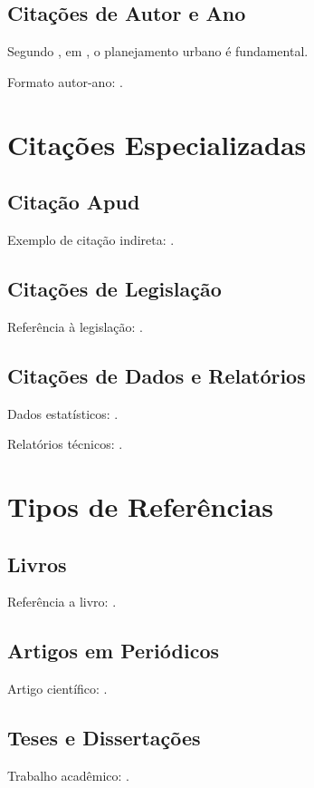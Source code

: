 \documentclass[mestrado]{UnB-PPGT}
\begin{document}
\subsection{Citações de Autor e Ano}
Segundo \citeauthor{costa2018}, em \citeyear{costa2018}, o planejamento urbano é fundamental.

Formato autor-ano: .

\section{Citações Especializadas}

\subsection{Citação Apud}
Exemplo de citação indireta: .

\subsection{Citações de Legislação}
Referência à legislação: .

\subsection{Citações de Dados e Relatórios}
Dados estatísticos: .

Relatórios técnicos: .

\section{Tipos de Referências}

\subsection{Livros}
Referência a livro: \cite{yin2015}.

\subsection{Artigos em Periódicos}
Artigo científico: \cite{silva2019}.

\subsection{Teses e Dissertações}
Trabalho acadêmico: \cite{santos2020}.
\end{document}
